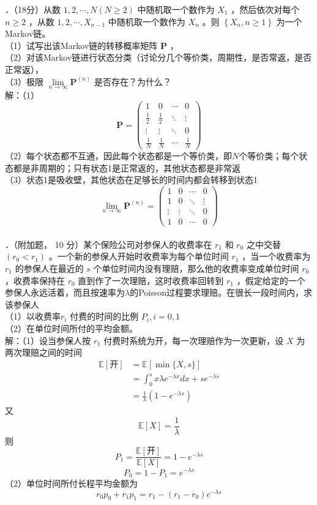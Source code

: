\documentclass[UTF8,openany]{book}
\begin{document}
．（18分）从数 $1,2, \cdots, N(N \geq 2)$ 中随机取一个数作为 $X_{1}$ ，然后依次对每个 $n \geq 2$ ，从数 $1,2, \cdots, X_{n-1}$ 中随机取一个数作为 $X_{n}$ 。则 $\left\{X_{n}, n \geq 1\right\}$ 为一个Markov链。\\
（1）试写出该Markov链的转移概率矩阵 $\mathbf{P}$ ，\\
（2）对该Markov链进行状态分类（讨论分几个等价类，周期性，是否常返，是否正常返），\\
（3）极限 $\lim\limits_{n \rightarrow \infty} \mathbf{P}^{(n)}$ 是否存在？为什么？\\
解：（1）
\[
\mathbf{P}=
\begin{pmatrix}
	1 & 0 & \cdots & 0 \\
	\frac{1}{2} & \frac{1}{2} & \ddots & \vdots \\
	\vdots & \vdots & \ddots & 0 \\
	\frac{1}{N}&\frac{1}{N} & \cdots & \frac{1}{N}
\end{pmatrix}
\]
（2）每个状态都不互通，因此每个状态都是一个等价类，即$N$个等价类；每个状态都是非周期的；只有状态1是正常返的，其他状态都是非常返\\
（3）状态1是吸收壁，其他状态在足够长的时间内都会转移到状态1
\[
\lim\limits_{n \rightarrow \infty} \mathbf{P}^{(n)}=
\begin{pmatrix}
	1 & 0 & \cdots & 0 \\
	1 & 0 & \ddots & \vdots \\
	\vdots & \vdots & \ddots & 0 \\
	1&0 & \cdots & 0
\end{pmatrix}
\]\\



．（附加题， 10 分）某个保险公司对参保人的收费率在 $r_{1}$ 和 $r_{0}$ 之中交替 $\left(r_{0}<r_{1}\right)$ 。一个新的参保人开始时收费率为每个单位时间 $r_{1}$ ，当一个收费率为 $r_{1}$ 的参保人在最近的 $s$ 个单位时间内没有理赔，那么他的收费率变成单位时间 $r_{0}$ ，收费率保持在 $r_{0}$ 直到作了一次理赔，这时收费率回转到 $r_{1}$ ，假定给定的一个参保人永远活着，而且按速率为$\lambda$的Poisson过程要求理赔。在很长一段时间内，求该参保人\\
（1）以收费率$r_{i}$ 付费的时间的比例 $P_{i}, i=0,1$ \\
（2）在单位时间所付的平均金额。\\
解：（1）设当参保人按 $r_1$ 付费时系统为开，每一次理赔作为一次更新，设 $X$ 为两次理赔之间的时间
$$
\begin{aligned}
	\mathbb{E}[\text{开}]&=\mathbb{E}[\min \{X,s\}]\\
	&=\int_0^s x\lambda e^{-\lambda x} d x+s e^{-\lambda s} \\
	& =\frac{1}{\lambda}\left(1-e^{-\lambda s}\right) 
\end{aligned}
$$
又
\[
\mathbb{E}[X]=\frac{1}{\lambda}
\]
则
\[
P_1=\frac{\mathbb{E}[\text{开}]}{\mathbb{E}[X]}=1-e^{-\lambda s}
\]
\[
P_0=1-P_1=e^{-\lambda s}
\]
（2）单位时间所付长程平均金额为
$$
r_0 p_0+r_1 p_1=r_1-\left(r_1-r_0\right) e^{-\lambda s}
$$
\newpage
\end{document}
